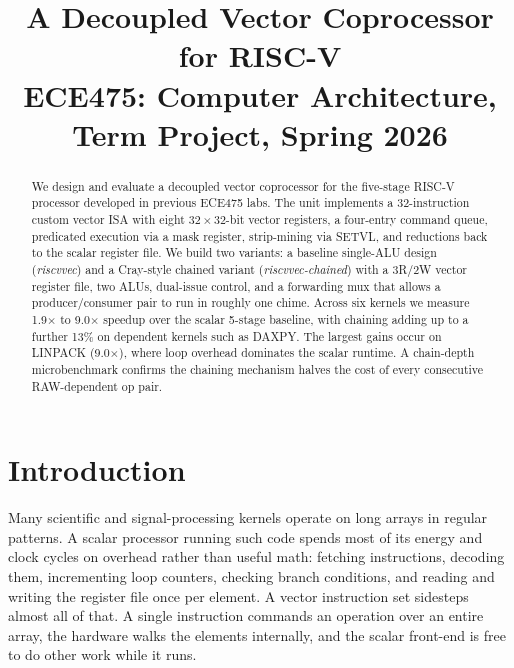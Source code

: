 \documentclass[conference]{IEEEtran}
\begin{document}
\title{A Decoupled Vector Coprocessor for RISC-V \\
{\Large ECE475: Computer Architecture, Term Project, Spring 2026}}

\author{
\and
{}
}

\maketitle

\begin{abstract}
We design and evaluate a decoupled vector coprocessor for the
five-stage RISC-V processor developed in previous ECE475 labs. The unit
implements a 32-instruction custom vector ISA with eight
$32 \times 32$-bit vector registers, a four-entry command queue,
predicated execution via a mask register, strip-mining via SETVL,
and reductions back to the scalar register file. We build two
variants: a baseline single-ALU design (\textit{riscvvec}) and a
Cray-style chained variant (\textit{riscvvec-chained}) with a 3R/2W
vector register file, two ALUs, dual-issue control, and a forwarding
mux that allows a producer/consumer pair to run in roughly one chime.
Across six kernels we measure 1.9$\times$ to 9.0$\times$ speedup over
the scalar 5-stage baseline, with chaining adding up to a further
13\% on dependent kernels such as DAXPY. The largest gains occur on
LINPACK (9.0$\times$), where loop overhead dominates the scalar
runtime. A chain-depth microbenchmark confirms the chaining
mechanism halves the cost of every consecutive RAW-dependent op pair.
\end{abstract}

\section{Introduction}
Many scientific and signal-processing kernels operate on long arrays
in regular patterns. A scalar processor running such code spends most
of its energy and clock cycles on overhead rather than useful math:
fetching instructions, decoding them, incrementing loop counters,
checking branch conditions, and reading and writing the register
file once per element. A vector instruction set sidesteps almost all
of that. A single instruction commands an operation over an entire
array, the hardware walks the elements internally, and the scalar
front-end is free to do other work while it runs.
\end{document}
